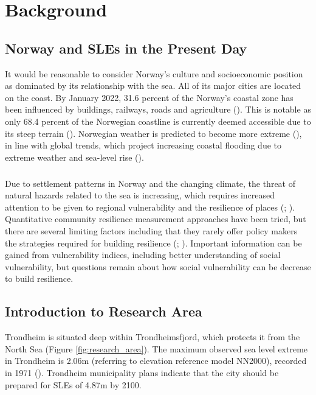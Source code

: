 \chapter{Background}

\section{Norway and SLEs in the Present Day}
 It would be reasonable to consider Norway's culture and socioeconomic position as dominated by its relationship with the sea. All of its major cities are located on the coast.  By January 2022, 31.6 percent of the Norway's coastal zone has been influenced by buildings, railways, roads and agriculture (\cite{engebakken_construction_2022}). This is notable as only 68.4 percent of the Norwegian coastline is currently deemed accessible due to its steep terrain (\cite{engebakken_construction_2022}). Norwegian weather is predicted to become more extreme (\cite{rod_integrated_2012}), in line with global trends, which project increasing coastal flooding due to extreme weather and sea-level rise (\cite{hoffken_effects_2020}). 
\paragraph{}

Due to settlement patterns in Norway and the changing climate, the threat of natural hazards related to the sea is increasing, which requires increased attention to be given to regional vulnerability and the resilience of places (\cite{opach_seeking_2020}; \cite{rod_three_2015}). Quantitative community resilience measurement approaches have been tried, but there are several limiting factors including that they rarely offer policy makers the strategies required for building resilience (\cite{opach_seeking_2020}; \cite{gerkensmeier_governing_2018}). Important information can be gained from vulnerability indices, including better understanding of social vulnerability, but questions remain about how social vulnerability can be decrease to build resilience. 


\section{Introduction to Research Area}

Trondheim is situated deep within Trondheimsfjord, which protects it from the North Sea (Figure \ref{fig:research_area}). The maximum observed sea level extreme in Trondheim is 2.06m (referring to elevation reference model NN2000), recorded in 1971 (\cite{tides_high_2022}). Trondheim municipality plans indicate that the city should be prepared for SLEs of 4.87m by 2100. 
